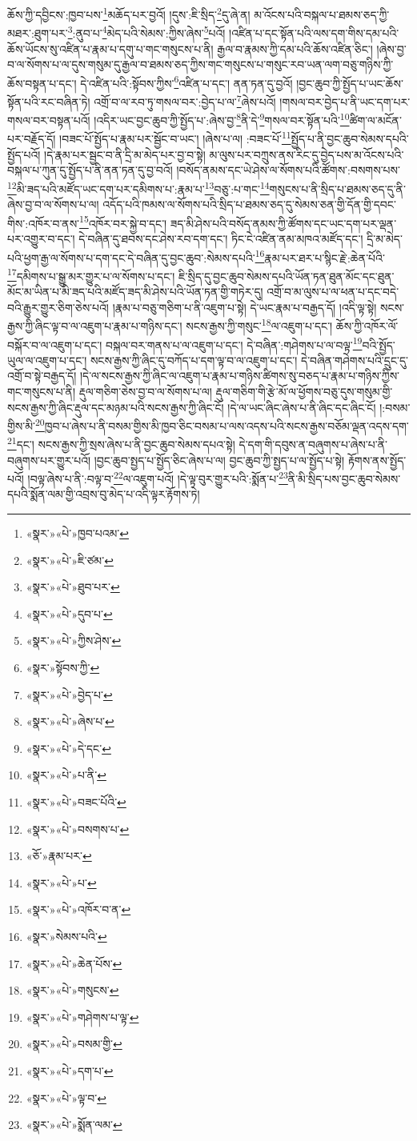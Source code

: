 ཆོས་ཀྱི་དབྱིངས་:ཁྱབ་པས་\footnote{«སྣར་»«པེ་»ཁྱབ་པའམ་}མཆོད་པར་བྱའོ། །དུས་:ཇི་སྲིད་\footnote{«སྣར་»«པེ་»ཇི་ཙམ་}དུ་ཞེ་ན། མ་འོངས་པའི་བསྐལ་པ་ཐམས་ཅད་ཀྱི་མཐར་:ཐུག་པར་\footnote{«སྣར་»«པེ་»ཐུབ་པར་}:ནུབ་པ་\footnote{«སྣར་»«པེ་»དུབ་པ་}མེད་པའི་སེམས་:ཀྱིས་ཞེས་\footnote{«སྣར་»«པེ་»ཀྱིས་ཤེས་}པའོ། །འཛིན་པ་དང་སྟོན་པའི་ལས་དག་གིས་དམ་པའི་ཆོས་ཡོངས་སུ་འཛིན་པ་རྣམ་པ་དགུ་པ་གང་གསུངས་པ་ནི། རྒྱལ་བ་རྣམས་ཀྱི་དམ་པའི་ཆོས་འཛིན་ཅིང་། །ཞེས་བྱ་བ་ལ་སོགས་པ་ལ་དུས་གསུམ་དུ་རྒྱལ་བ་ཐམས་ཅད་ཀྱིས་གང་གསུངས་པ་གསུང་རབ་ཡན་ལག་བཅུ་གཉིས་ཀྱི་ཆོས་བསྟན་པ་དང་། དེ་འཛིན་པའི་:སྟོབས་ཀྱིས་\footnote{«སྣར་»སྟོབས་ཀྱི་}འཛིན་པ་དང་། ནན་ཏན་དུ་བྱའོ། །བྱང་ཆུབ་ཀྱི་སྤྱོད་པ་ཡང་ཆོས་སྟོན་པའི་རང་བཞིན་ཏེ། འགྲོ་བ་ལ་རབ་ཏུ་གསལ་བར་:བྱེད་པ་ལ་\footnote{«སྣར་»«པེ་»བྱེད་པ་}ཞེས་པའོ། །གསལ་བར་བྱེད་པ་ནི་ཡང་དག་པར་གསལ་བར་བསྟན་པའོ། །འདིར་ཡང་བྱང་ཆུབ་ཀྱི་སྤྱོད་པ་:ཞེས་བྱ་\footnote{«སྣར་»«པེ་»ཞེས་པ་}ནི་དེ་\footnote{«སྣར་»«པེ་»དེ་དང་}གསལ་བར་སྟོན་པའི་\footnote{«སྣར་»«པེ་»པ་ནི་}ཚིག་ལ་མངོན་པར་བརྗོད་དོ། །བཟང་པོ་སྤྱོད་པ་རྣམ་པར་སྦྱོང་བ་ཡང་། །ཞེས་པ་ལ། :བཟང་པོ་\footnote{«སྣར་»«པེ་»བཟང་པོའི་}སྤྱོད་པ་ནི་བྱང་ཆུབ་སེམས་དཔའི་སྤྱོད་པའོ། །དེ་རྣམ་པར་སྦྱང་བ་ནི་དྲི་མ་མེད་པར་བྱ་བ་སྟེ། མ་ལུས་པར་བཀྲུས་ནས་རིང་དུ་བྱེད་པས་མ་འོངས་པའི་བསྐལ་པ་ཀུན་དུ་སྤྱོད་པ་ནི་ནན་ཏན་དུ་བྱ་བའོ། །བསོད་ནམས་དང་ཡེ་ཤེས་ལ་སོགས་པའི་ཚོགས་:བསགས་པས་\footnote{«སྣར་»«པེ་»བསགས་པ་}མི་ཟད་པའི་མཛོད་ཡང་དག་པར་དམིགས་པ་:རྣམ་པ་\footnote{«ཅོ་»རྣམ་པར་}བཅུ་:པ་གང་\footnote{«སྣར་»«པེ་»པ་}གསུངས་པ་ནི་སྲིད་པ་ཐམས་ཅད་དུ་ནི་ཞེས་བྱ་བ་ལ་སོགས་པ་ལ། འདོད་པའི་ཁམས་ལ་སོགས་པའི་སྲིད་པ་ཐམས་ཅད་དུ་སེམས་ཅན་གྱི་དོན་གྱི་དབང་གིས་:འཁོར་བ་ནས་\footnote{«སྣར་»«པེ་»འཁོར་བ་ན་}འཁོར་བར་སྐྱེ་བ་དང་། ཟད་མི་ཤེས་པའི་བསོད་ནམས་ཀྱི་ཚོགས་དང་ཡང་དག་པར་ལྡན་པར་འགྱུར་བ་དང་། དེ་བཞིན་དུ་ཐབས་དང་ཤེས་རབ་དག་དང་། ཏིང་ངེ་འཛིན་ནམ་མཁའ་མཛོད་དང་། དྲི་མ་མེད་པའི་ཕྱག་རྒྱ་ལ་སོགས་པ་དག་དང་དེ་བཞིན་དུ་བྱང་ཆུབ་:སེམས་དཔའི་\footnote{«སྣར་»སེམས་པའི་}རྣམ་པར་ཐར་པ་སྙིང་རྗེ་:ཆེན་པོའི་\footnote{«སྣར་»«པེ་»ཆེན་པོས་}དམིགས་པ་སྒྱུ་མར་གྱུར་པ་ལ་སོགས་པ་དང་། ཇི་སྲིད་དུ་བྱང་ཆུབ་སེམས་དཔའི་ཡོན་ཏན་ཐུན་མོང་དང་ཐུན་མོང་མ་ཡིན་པ་མི་ཟད་པའི་མཛོད་ཟད་མི་ཤེས་པའི་ཡོན་ཏན་གྱི་གཏེར་དུ། འགྲོ་བ་མ་ལུས་པ་ལ་ཕན་པ་དང་བདེ་བའི་རྒྱུར་གྱུར་ཅིག་ཅེས་པའོ། །རྣམ་པ་བཅུ་གཅིག་པ་ནི་འཇུག་པ་སྟེ། དེ་ཡང་རྣམ་པ་བརྒྱད་དོ། །འདི་ལྟ་སྟེ། སངས་རྒྱས་ཀྱི་ཞིང་ལྟ་བ་ལ་འཇུག་པ་རྣམ་པ་གཉིས་དང་། སངས་རྒྱས་ཀྱི་གསུང་\footnote{«སྣར་»«པེ་»གསུངས་}ལ་འཇུག་པ་དང་། ཆོས་ཀྱི་འཁོར་ལོ་བསྐོར་བ་ལ་འཇུག་པ་དང་། བསྐལ་བར་གནས་པ་ལ་འཇུག་པ་དང་། དེ་བཞིན་:གཤེགས་པ་ལ་བལྟ་\footnote{«སྣར་»«པེ་»གཤེགས་པ་ལྟ་}བའི་སྤྱོད་ཡུལ་ལ་འཇུག་པ་དང་། སངས་རྒྱས་ཀྱི་ཞིང་དུ་བཀོད་པ་དག་ལྟ་བ་ལ་འཇུག་པ་དང་། དེ་བཞིན་གཤེགས་པའི་དྲུང་དུ་འགྲོ་བ་སྟེ་བརྒྱད་དོ། །དེ་ལ་སངས་རྒྱས་ཀྱི་ཞིང་ལ་འཇུག་པ་རྣམ་པ་གཉིས་ཚིགས་སུ་བཅད་པ་རྣམ་པ་གཉིས་ཀྱིས་གང་གསུངས་པ་ནི། རྡུལ་གཅིག་ཅེས་བྱ་བ་ལ་སོགས་པ་ལ། རྡུལ་གཅིག་གི་རྩེ་མོ་ལ་ཕྱོགས་བཅུ་དུས་གསུམ་གྱི་སངས་རྒྱས་ཀྱི་ཞིང་རྡུལ་དང་མཉམ་པའི་སངས་རྒྱས་ཀྱི་ཞིང་ངོ། །དེ་ལ་ཡང་ཞིང་ཞེས་པ་ནི་ཞིང་དང་ཞིང་ངོ། །:བསམ་གྱིས་མི་\footnote{«སྣར་»«པེ་»བསམ་གྱི་}ཁྱབ་པ་ཞེས་པ་ནི་བསམ་གྱིས་མི་ཁྱབ་ཅིང་བསམ་པ་ལས་འདས་པའི་སངས་རྒྱས་བཅོམ་ལྡན་འདས་དག་\footnote{«སྣར་»«པེ་»དག་པ་}དང་། སངས་རྒྱས་ཀྱི་སྲས་ཞེས་པ་ནི་བྱང་ཆུབ་སེམས་དཔའ་སྟེ། དེ་དག་གི་དབུས་ན་བཞུགས་པ་ཞེས་པ་ནི་བཞུགས་པར་གྱུར་པའོ། །བྱང་ཆུབ་སྤྱད་པ་སྤྱོད་ཅིང་ཞེས་པ་ལ། བྱང་ཆུབ་ཀྱི་སྤྱད་པ་ལ་སྤྱོད་པ་སྟེ། རྟོགས་ནས་སྤྱོད་པའོ། །བལྟ་ཞེས་པ་ནི་:བལྟ་བ་\footnote{«སྣར་»«པེ་»ལྟ་བ་}ལ་འཇུག་པའོ། །དེ་ལྟ་བུར་གྱུར་པའི་:སྨོན་པ་\footnote{«སྣར་»«པེ་»སྨོན་ལམ་}ནི་མི་སྲིད་པས་བྱང་ཆུབ་སེམས་དཔའི་སྨོན་ལམ་གྱི་འབྲས་བུ་མེད་པ་འདི་ལྟར་རྟོགས་ཏེ། 
